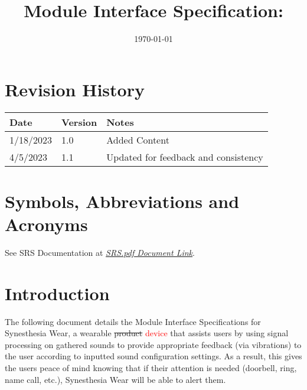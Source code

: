 \documentclass[12pt, titlepage]{article}
\begin{document}
\title{Module Interface Specification: \progname{}}

\author{\authname}

\date{\today}

\maketitle


\section*{Revision History}

\begin{tabularx}{\textwidth}{p{3cm}p{2cm}X}
\toprule {\bf Date} & {\bf Version} & {\bf Notes}\\
\midrule
1/18/2023 & 1.0 & Added Content\\
4/5/2023 & 1.1 & Updated for feedback and consistency\\
\bottomrule
\end{tabularx}

\newpage

\tableofcontents

\listoffigures

\listoftables

\newpage

\section*{Symbols, Abbreviations and Acronyms}

See SRS Documentation at  \href{https://github.com/jordanbierbrier/capstone/blob/main/docs/SRS/SRS.pdf}{\textit{SRS.pdf Document Link}}.

\newpage


\section{Introduction}

The following document details the Module Interface Specifications for Synesthesia Wear, a wearable \sout{product} \textcolor{red}{device} that assists users by using signal processing on gathered sounds 
to provide appropriate feedback (via vibrations) to the user according to inputted sound configuration settings. As a result, this gives the users peace of mind knowing that if their attention 
is needed (doorbell, ring, name call, etc.), Synesthesia Wear will be able to alert them.
\end{document}
